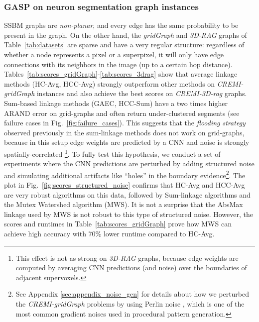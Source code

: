 \subsubsection{GASP on neuron segmentation graph instances}
SSBM graphs are \emph{non-planar}, and every edge has the same probability to be present in the graph. On the other hand, the \emph{gridGraph} and \emph{3D-RAG} graphs of Table~\ref{tab:datasets} are sparse and have a very regular structure: regardless of whether a node represents a pixel or a superpixel, it will only have edge connections with its neighbors in the image (up to a certain hop distance). 
Tables~\ref{tab:scores_gridGraph}-\ref{tab:scores_3drag} show that average linkage methods (HC-Avg, HCC-Avg) strongly outperform other methods on \emph{CREMI-gridGraph} instances and also achieve the best scores on \emph{CREMI-3D-rag} graphs. Sum-based linkage methods (GAEC, HCC-Sum) have a two times higher ARAND error on grid-graphs and often return under-clustered segments (see failure cases in Fig.~\ref{fig:failure_cases}). This suggests that the \emph{flooding strategy} observed previously in the sum-linkage methods does not work on grid-graphs, because in this setup edge weights are predicted by a CNN and noise is strongly spatially-correlated \footnote{This effect is not as strong on \emph{3D-RAG} graphs, because edge weights are computed by averaging CNN predictions (and noise) over the boundaries of adjacent supervoxels.}.
To fully test this hypothesis, we conduct a set of experiments where the CNN predictions are perturbed by adding structured noise and simulating additional artifacts like ``holes'' in the boundary evidence\footnote{See Appendix \ref{sec:appendix_noise_gen} for details about how we perturbed the \emph{CREMI-gridGraph} problems by using Perlin noise \cite{perlin2001noise,perlin1985image}, which is one of the most common gradient noises used in procedural pattern generation.}. 
The plot in Fig.~\ref{fig:scores_structured_noise} confirms that HC-Avg and HCC-Avg are very robust algorithms on this data, followed by Sum-linkage algorithms and the Mutex Watershed algorithm (MWS). It is not a surprise that the AbsMax linkage used by MWS is not robust to this type of structured noise. However, the scores and runtimes in Table~\ref{tab:scores_gridGraph} prove how MWS can achieve high accuracy with 70\% lower runtime compared to HC-Avg. 


